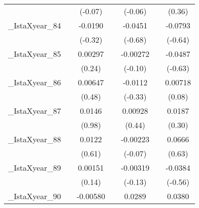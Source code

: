 {\begin{tabular}{l*{6}{c}}
            &                     &     (-0.07)         &                     &     (-0.06)         &                     &      (0.36)         \\
[1em]
\_IstaXyear\_84&                     &     -0.0190         &                     &     -0.0451         &                     &     -0.0793         \\
            &                     &     (-0.32)         &                     &     (-0.68)         &                     &     (-0.64)         \\
[1em]
\_IstaXyear\_85&                     &     0.00297         &                     &    -0.00272         &                     &     -0.0487         \\
            &                     &      (0.24)         &                     &     (-0.10)         &                     &     (-0.63)         \\
[1em]
\_IstaXyear\_86&                     &     0.00647         &                     &     -0.0112         &                     &     0.00718         \\
            &                     &      (0.48)         &                     &     (-0.33)         &                     &      (0.08)         \\
[1em]
\_IstaXyear\_87&                     &      0.0146         &                     &     0.00928         &                     &      0.0187         \\
            &                     &      (0.98)         &                     &      (0.44)         &                     &      (0.30)         \\
[1em]
\_IstaXyear\_88&                     &      0.0122         &                     &    -0.00223         &                     &      0.0666         \\
            &                     &      (0.61)         &                     &     (-0.07)         &                     &      (0.63)         \\
[1em]
\_IstaXyear\_89&                     &     0.00151         &                     &    -0.00319         &                     &     -0.0384         \\
            &                     &      (0.14)         &                     &     (-0.13)         &                     &     (-0.56)         \\
[1em]
\_IstaXyear\_90&                     &    -0.00580         &                     &      0.0289         &                     &      0.0380         \\

\end{tabular}}
